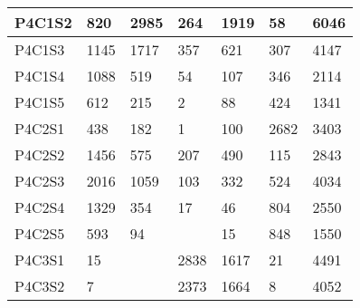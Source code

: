 \begin{longtable}{lllllll}
\multicolumn{1}{|l|}{P4C1S2} & \multicolumn{1}{l|}{820} & \multicolumn{1}{l|}{2985} & \multicolumn{1}{l|}{264} & \multicolumn{1}{l|}{1919} & \multicolumn{1}{l|}{58} & \multicolumn{1}{l|}{6046} \\ \hline
\multicolumn{1}{|l|}{P4C1S3} & \multicolumn{1}{l|}{1145} & \multicolumn{1}{l|}{1717} & \multicolumn{1}{l|}{357} & \multicolumn{1}{l|}{621} & \multicolumn{1}{l|}{307} & \multicolumn{1}{l|}{4147} \\ \hline
\multicolumn{1}{|l|}{P4C1S4} & \multicolumn{1}{l|}{1088} & \multicolumn{1}{l|}{519} & \multicolumn{1}{l|}{54} & \multicolumn{1}{l|}{107} & \multicolumn{1}{l|}{346} & \multicolumn{1}{l|}{2114} \\ \hline
\multicolumn{1}{|l|}{P4C1S5} & \multicolumn{1}{l|}{612} & \multicolumn{1}{l|}{215} & \multicolumn{1}{l|}{2} & \multicolumn{1}{l|}{88} & \multicolumn{1}{l|}{424} & \multicolumn{1}{l|}{1341} \\ \hline
\multicolumn{1}{|l|}{P4C2S1} & \multicolumn{1}{l|}{438} & \multicolumn{1}{l|}{182} & \multicolumn{1}{l|}{1} & \multicolumn{1}{l|}{100} & \multicolumn{1}{l|}{2682} & \multicolumn{1}{l|}{3403} \\ \hline
\multicolumn{1}{|l|}{P4C2S2} & \multicolumn{1}{l|}{1456} & \multicolumn{1}{l|}{575} & \multicolumn{1}{l|}{207} & \multicolumn{1}{l|}{490} & \multicolumn{1}{l|}{115} & \multicolumn{1}{l|}{2843} \\ \hline
\multicolumn{1}{|l|}{P4C2S3} & \multicolumn{1}{l|}{2016} & \multicolumn{1}{l|}{1059} & \multicolumn{1}{l|}{103} & \multicolumn{1}{l|}{332} & \multicolumn{1}{l|}{524} & \multicolumn{1}{l|}{4034} \\ \hline
\multicolumn{1}{|l|}{P4C2S4} & \multicolumn{1}{l|}{1329} & \multicolumn{1}{l|}{354} & \multicolumn{1}{l|}{17} & \multicolumn{1}{l|}{46} & \multicolumn{1}{l|}{804} & \multicolumn{1}{l|}{2550} \\ \hline
\multicolumn{1}{|l|}{P4C2S5} & \multicolumn{1}{l|}{593} & \multicolumn{1}{l|}{94} & \multicolumn{1}{l|}{} & \multicolumn{1}{l|}{15} & \multicolumn{1}{l|}{848} & \multicolumn{1}{l|}{1550} \\ \hline
\multicolumn{1}{|l|}{P4C3S1} & \multicolumn{1}{l|}{15} & \multicolumn{1}{l|}{} & \multicolumn{1}{l|}{2838} & \multicolumn{1}{l|}{1617} & \multicolumn{1}{l|}{21} & \multicolumn{1}{l|}{4491} \\ \hline
\multicolumn{1}{|l|}{P4C3S2} & \multicolumn{1}{l|}{7} & \multicolumn{1}{l|}{} & \multicolumn{1}{l|}{2373} & \multicolumn{1}{l|}{1664} & \multicolumn{1}{l|}{8} & \multicolumn{1}{l|}{4052} \\ \hline

\end{longtable}
